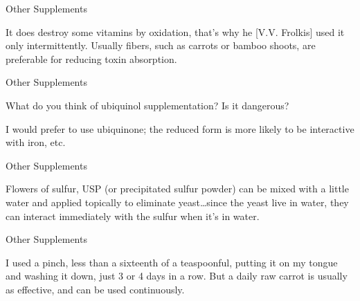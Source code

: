 \documentclass[11pt,oneside,openany,extrafontsizes]{memoir}
\begin{document}
\begin{standalonequote}{Other Supplements}

    \begin{answer}
        It does destroy some vitamins by oxidation, that's why he [V.V. Frolkis] used it only intermittently. Usually fibers, such as carrots or bamboo shoots, are preferable for reducing toxin absorption.
    \end{answer}
\end{standalonequote}

\begin{qaexchange}{Other Supplements}

    \begin{question}
        What do you think of ubiquinol supplementation? Is it dangerous?
    \end{question}

    \begin{answer}
        I would prefer to use ubiquinone; the reduced form is more likely to be interactive with iron, etc.
    \end{answer}
\end{qaexchange}

\begin{standalonequote}{Other Supplements}

    \begin{answer}
        Flowers of sulfur, USP (or precipitated sulfur powder) can be mixed with a little water and applied topically to eliminate yeast\dots{}since the yeast live in water, they can interact immediately with the sulfur when it's in water.
    \end{answer}
\end{standalonequote}

\begin{standalonequote}{Other Supplements}

    \begin{answer}
        I used a pinch, less than a sixteenth of a teaspoonful, putting it on my tongue and washing it down, just 3 or 4 days in a row. But a daily raw carrot is usually as effective, and can be used continuously.
    \end{answer}
\end{standalonequote}
\end{document}
